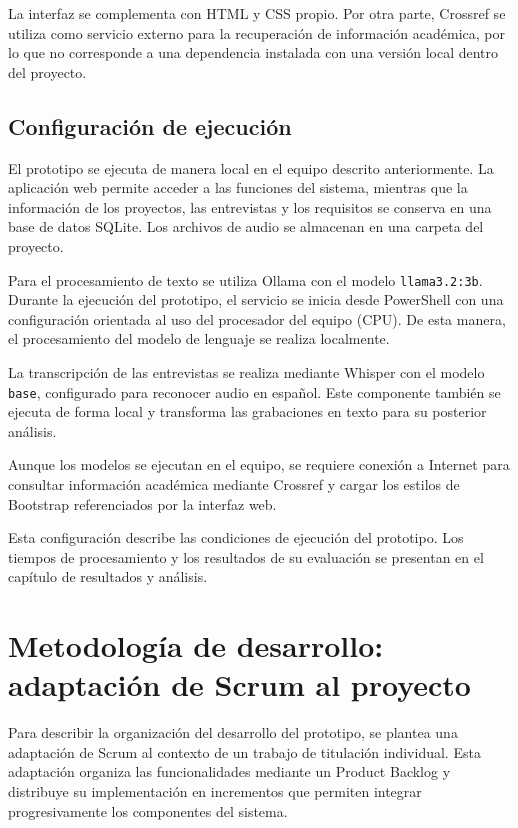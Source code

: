 La interfaz se complementa con HTML y CSS propio.
Por otra parte, Crossref se utiliza como servicio externo
para la recuperación de información académica, por lo que
no corresponde a una dependencia instalada con una versión
local dentro del proyecto.

\subsection{Configuración de ejecución}
El prototipo se ejecuta de manera local en el equipo
descrito anteriormente. La aplicación web permite acceder
a las funciones del sistema, mientras que la información
de los proyectos, las entrevistas y los requisitos se
conserva en una base de datos SQLite. Los archivos de
audio se almacenan en una carpeta del proyecto.

Para el procesamiento de texto se utiliza Ollama con
el modelo \texttt{llama3.2:3b}. Durante la ejecución
del prototipo, el servicio se inicia desde PowerShell
con una configuración orientada al uso del procesador
del equipo (CPU). De esta manera, el procesamiento
del modelo de lenguaje se realiza localmente.

La transcripción de las entrevistas se realiza mediante
Whisper con el modelo \texttt{base}, configurado para
reconocer audio en español. Este componente también
se ejecuta de forma local y transforma las grabaciones
en texto para su posterior análisis.

Aunque los modelos se ejecutan en el equipo, se requiere
conexión a Internet para consultar información académica
mediante Crossref y cargar los estilos de Bootstrap
referenciados por la interfaz web.

Esta configuración describe las condiciones de ejecución
del prototipo. Los tiempos de procesamiento y los
resultados de su evaluación se presentan en el
capítulo de resultados y análisis.





\section{Metodología de desarrollo: adaptación de Scrum al proyecto}
Para describir la organización del desarrollo del prototipo,
se plantea una adaptación de Scrum al contexto de un trabajo
de titulación individual. Esta adaptación organiza las
funcionalidades mediante un Product Backlog y distribuye
su implementación en incrementos que permiten integrar
progresivamente los componentes del sistema.

